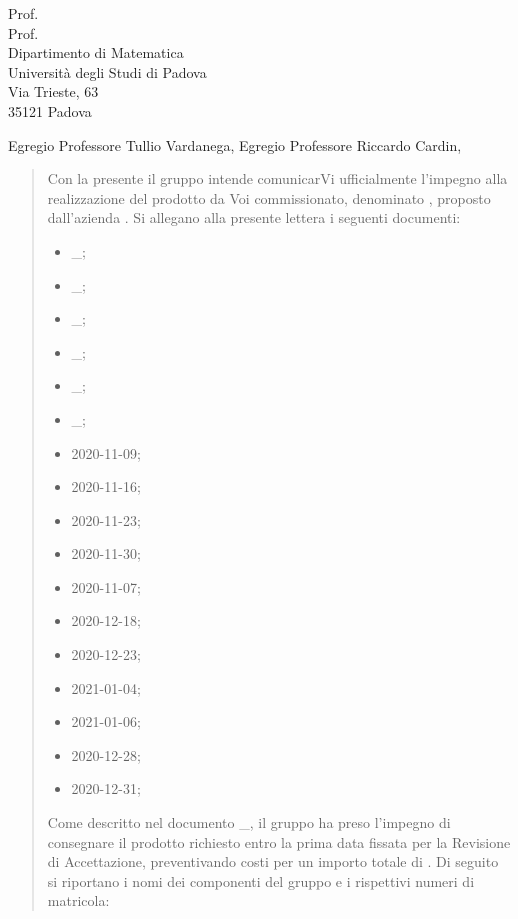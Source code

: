 \documentclass[a4paper,12pt]{letteracdp}
\date{11 gennaio 2021}
\begin{document}
\thispagestyle{empty}

\begin{letter}{
	Prof. \Tullio{} \\
	Prof. \Riccardo{} \\
	Dipartimento di Matematica \\
	Università degli Studi di Padova \\
	Via Trieste, 63 \\
	35121 Padova}
	
\opening{Egregio Professore Tullio Vardanega, \newline
Egregio Professore Riccardo Cardin,}

\begin{quotation}
	\noindent 
	Con la presente il gruppo \gruppo{} intende comunicarVi ufficialmente l'impegno alla realizzazione del prodotto da Voi commissionato, denominato \progetto{}, proposto dall’azienda \proponente.\newline
	Si allegano alla presente lettera i seguenti documenti:
	\begin{itemize}
		\item \docSdF{}\_\versSdF;
		\item \docAdR{}\_\versAdR;
		\item \docG{}\_\versGlo;
		\item \docNdP{}\_\versNdP;
		\item \docPdP{}\_\versPdP;
		\item \docPdQ{}\_\versPdQ;
		\item \docVI{}2020-11-09;
		\item \docVI{}2020-11-16;
		\item \docVI{}2020-11-23;
		\item \docVI{}2020-11-30;
		\item \docVI{}2020-11-07;
		\item \docVI{}2020-12-18;
		\item \docVI{}2020-12-23;
		\item \docVI{}2021-01-04;
		\item \docVI{}2021-01-06;
		\item \docVE{}2020-12-28;
		\item \docVE{}2020-12-31;
\thispagestyle{empty}		
	\end{itemize}
Come descritto nel documento \docPdP{}\_\versPdP{}, il gruppo \gruppo{} ha preso l'impegno di consegnare il prodotto richiesto entro la prima data fissata per la Revisione di Accettazione, preventivando costi per un importo totale di \textbf{}. \newline
Di seguito si riportano i nomi dei componenti del gruppo e i rispettivi numeri di matricola:
	

\end{quotation}
\end{letter}
\end{document}
